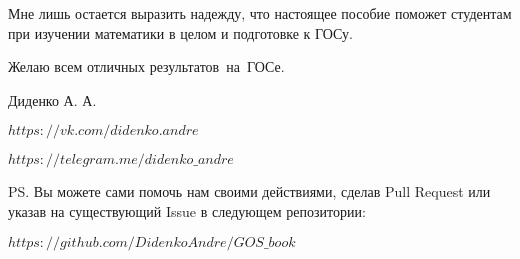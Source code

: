 Мне лишь остается выразить надежду, что настоящее пособие поможет студентам при изучении математики в целом и подготовке к ГОСу.
\vspace*{\baselineskip}

Желаю всем отличных результатов~на~ГОСе.

\mbox{}

\noindent Диденко А. А.

\noindent\href{https://vk.com/didenko.andre}{$https://vk.com/didenko.andre$}

\noindent\href{https://telegram.me/didenko_andre}{$https://telegram.me/didenko\_andre$}

\mbox{}

\noindent PS. Вы можете сами помочь нам своими действиями, сделав Pull Request или указав на существующий Issue в следующем репозитории:

\noindent\href{https://github.com/DidenkoAndre/GOS_book}{$https://github.com/DidenkoAndre/GOS\_book$}